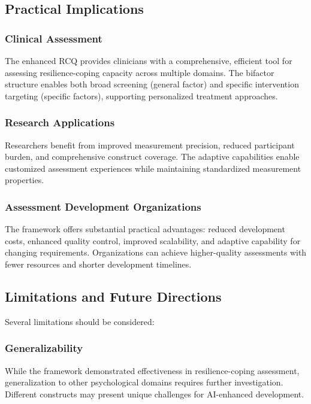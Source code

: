 \documentclass[12pt,a4paper]{article}
\begin{document}
\subsection{Practical Implications}

\subsubsection{Clinical Assessment}
The enhanced RCQ provides clinicians with a comprehensive, efficient tool for assessing resilience-coping capacity across multiple domains. The bifactor structure enables both broad screening (general factor) and specific intervention targeting (specific factors), supporting personalized treatment approaches.

\subsubsection{Research Applications}
Researchers benefit from improved measurement precision, reduced participant burden, and comprehensive construct coverage. The adaptive capabilities enable customized assessment experiences while maintaining standardized measurement properties.

\subsubsection{Assessment Development Organizations}
The framework offers substantial practical advantages: reduced development costs, enhanced quality control, improved scalability, and adaptive capability for changing requirements. Organizations can achieve higher-quality assessments with fewer resources and shorter development timelines.

\subsection{Limitations and Future Directions}

Several limitations should be considered:

\subsubsection{Generalizability}
While the framework demonstrated effectiveness in resilience-coping assessment, generalization to other psychological domains requires further investigation. Different constructs may present unique challenges for AI-enhanced development.
\end{document}

